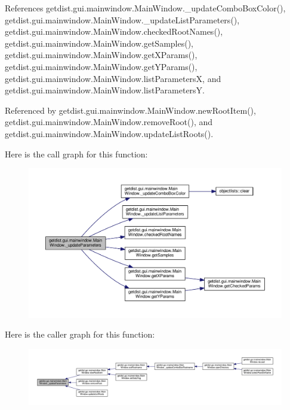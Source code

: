 References getdist.\+gui.\+mainwindow.\+Main\+Window.\+\_\+update\+Combo\+Box\+Color(), getdist.\+gui.\+mainwindow.\+Main\+Window.\+\_\+update\+List\+Parameters(), getdist.\+gui.\+mainwindow.\+Main\+Window.\+checked\+Root\+Names(), getdist.\+gui.\+mainwindow.\+Main\+Window.\+get\+Samples(), getdist.\+gui.\+mainwindow.\+Main\+Window.\+get\+X\+Params(), getdist.\+gui.\+mainwindow.\+Main\+Window.\+get\+Y\+Params(), getdist.\+gui.\+mainwindow.\+Main\+Window.\+list\+ParametersX, and getdist.\+gui.\+mainwindow.\+Main\+Window.\+list\+ParametersY.



Referenced by getdist.\+gui.\+mainwindow.\+Main\+Window.\+new\+Root\+Item(), getdist.\+gui.\+mainwindow.\+Main\+Window.\+remove\+Root(), and getdist.\+gui.\+mainwindow.\+Main\+Window.\+update\+List\+Roots().

Here is the call graph for this function\+:
\nopagebreak
\begin{figure}[H]
\begin{center}
\leavevmode
\includegraphics[width=350pt]{classgetdist_1_1gui_1_1mainwindow_1_1MainWindow_a77a47206bb3e2ecb4dbac87af2f85f6e_cgraph}
\end{center}
\end{figure}
Here is the caller graph for this function\+:
\nopagebreak
\begin{figure}[H]
\begin{center}
\leavevmode
\includegraphics[width=350pt]{classgetdist_1_1gui_1_1mainwindow_1_1MainWindow_a77a47206bb3e2ecb4dbac87af2f85f6e_icgraph}
\end{center}
\end{figure}
\mbox{\label{classgetdist_1_1gui_1_1mainwindow_1_1MainWindow_a8939fab5efd75328433f70cb035edb0a}} 
